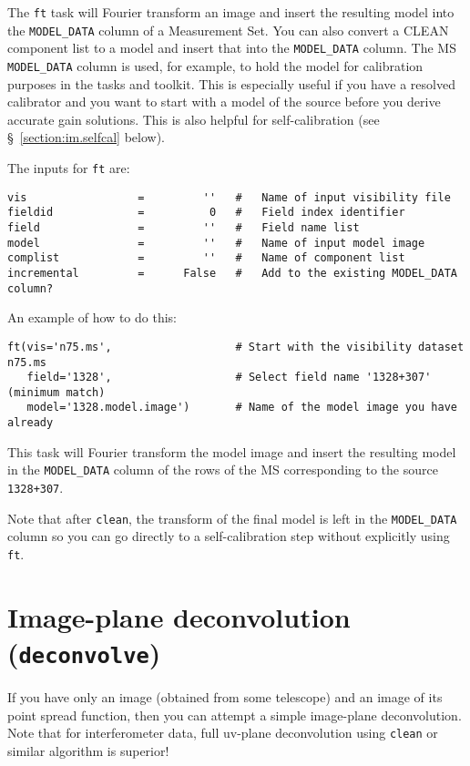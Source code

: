 The {\tt ft} task will Fourier transform an image and insert the resulting model into the
{\tt MODEL\_DATA} column of a Measurement Set.
You can also convert a CLEAN component list to a model and insert that
into the {\tt MODEL\_DATA} column.  The MS {\tt MODEL\_DATA} column is
used, for example, to hold the model for calibration purposes in 
the tasks and toolkit.  This is especially useful if you have a resolved
calibrator and you want to start with a model of the source before you
derive accurate gain solutions.  This is also helpful for self-calibration
(see \S~\ref{section:im.selfcal} below).

The inputs for {\tt ft} are:
\small
\begin{verbatim}
vis                 =         ''   #   Name of input visibility file
fieldid             =          0   #   Field index identifier
field               =         ''   #   Field name list
model               =         ''   #   Name of input model image
complist            =         ''   #   Name of component list
incremental         =      False   #   Add to the existing MODEL_DATA column?
\end{verbatim}
\normalsize

An example of how to do this: 
\small
\begin{verbatim}
ft(vis='n75.ms',                   # Start with the visibility dataset n75.ms
   field='1328',                   # Select field name '1328+307' (minimum match) 
   model='1328.model.image')       # Name of the model image you have already
\end{verbatim}
\normalsize
This task will Fourier transform the model image and insert the
resulting model in the {\tt MODEL\_DATA} column of the rows of the MS 
corresponding to the source {\tt 1328+307}.

Note that after {\tt clean}, the transform of the final model is
left in the {\tt MODEL\_DATA} column so you can go directly to
a self-calibration step without explicitly using {\tt ft}.

\section{Image-plane deconvolution ({\tt deconvolve})}
\label{section:im.deconvolve}

If you have only an image (obtained from some telescope) and an image
of its point spread function, then you can attempt a simple image-plane
deconvolution.  Note that for interferometer data, full uv-plane 
deconvolution using {\tt clean} or similar algorithm is superior!

